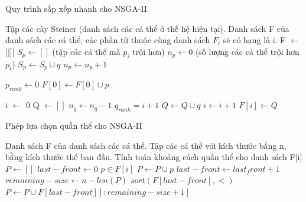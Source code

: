 \documentclass{hust}
\begin{document}
\begin{algorithm}[H]
	\caption{Quy trình sắp xếp nhanh cho \gls{NSGA-II}}\label{alg:fast_non_dominated_sort}
	\begin{algorithmic}[1]
		\Require Tập các cây Steiner (danh sách các cá thể ở thế hệ hiện tại).
		\Ensure Danh sách F của danh sách các cá thể, các phần tử thuộc cùng danh sách $F_i$ sẽ có hạng là i.
		\State F $\leftarrow$ [[]]
			\State $S_p \leftarrow []$ (tập các cá thể mà $p_i$ trội hơn)
			\State $n_p \leftarrow 0$ (số lượng các cá thể trội hơn $p_i$)
					\State $S_p \leftarrow S_p \cup q$
				\Else
					\State $n_p \leftarrow n_p + 1$
				\EndIf
			\EndFor
			
				\State $p_{rank} \leftarrow 0$
				\State $F[0] \leftarrow F[0] \cup p$
			\EndIf
		\EndFor
		
		\State i $\leftarrow$ 0
			\State Q $\leftarrow []$
					$n_q \leftarrow n_q - 1$
						\State $q_{rank} = i+1$
						\State $Q \leftarrow Q \cup q$
					\EndIf
				\EndFor
			\EndFor
			\State $i \leftarrow i+1$
			\State $F[i] \leftarrow Q$
		\EndWhile
		
		
	\end{algorithmic}
\end{algorithm}

\begin{algorithm}[H]
	\caption{Phép lựa chọn quần thể cho \gls{NSGA-II}}
	\label{alg:select_parents}
	\begin{algorithmic}[1]
		\Require Danh sách F của danh sách các cá thể.
		\Ensure Tập các cá thể với kích thước bằng n, bằng kích thước thể ban đầu.
			\State Tính toán khoảng cách quần thể cho danh sách F[i]
		\EndFor
		\State $P \leftarrow []$
		\State $last-front \leftarrow 0$
				\For $p \in F[i]$
					$P \leftarrow P \cup p$
				\EndFor
				\State $last-front \leftarrow last_front+1$
			\EndIf
		\EndFor
		\State $remaining-size \leftarrow n - len(P)$
			\State $sort(F[last-front], <)$
			\State $P \leftarrow P \cup F[last-front][:remaining-size+1]$
		\EndIf
	\end{algorithmic}
\end{algorithm}
\end{document}
